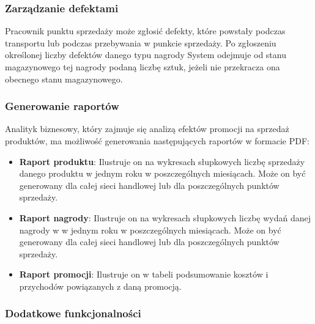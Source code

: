 \documentclass[a4paper,12pt]{article}
\begin{document}
\subsubsection{Zarządzanie defektami}

Pracownik punktu sprzedaży może zgłosić defekty, które powstały podczas transportu lub podczas przebywania w punkcie sprzedaży.
Po zgłoszeniu określonej liczby defektów danego typu nagrody System odejmuje od stanu magazynowego tej nagrody podaną liczbę sztuk, jeżeli nie przekracza ona obecnego stanu magazynowego.

\subsubsection{Generowanie raportów}

Analityk biznesowy, który zajmuje się analizą efektów promocji na sprzedaż produktów, ma możliwość generowania następujących raportów w formacie PDF:
\begin{itemize}
    \item \textbf{Raport produktu}:
    Ilustruje on na wykresach słupkowych liczbę sprzedaży danego produktu w jednym roku w poszczególnych miesiącach.
    Może on być generowany dla całej sieci handlowej lub dla poszczególnych punktów sprzedaży.
    \item \textbf{Raport nagrody}:
    Ilustruje on na wykresach słupkowych liczbę wydań danej nagrody w w jednym roku w poszczególnych miesiącach.
    Może on być generowany dla całej sieci handlowej lub dla poszczególnych punktów sprzedaży.
    \item \textbf{Raport promocji}:
    Ilustruje on w tabeli podsumowanie kosztów i przychodów powiązanych z daną promocją.
\end{itemize}

\subsubsection{Dodatkowe funkcjonalności}
\end{document}

